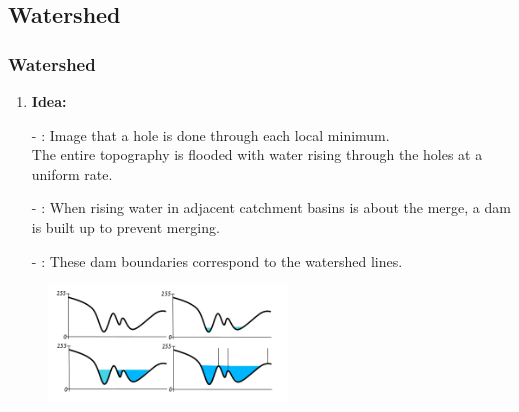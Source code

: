 \documentclass[notheorems,mathserif,table,compress]{beamer}  %
\begin{document}
\subsection{Watershed}
\begin{frame}
    \frametitle{Watershed}
    \begin{enumerate}[{\color{black}{\Large (A)}}]
    \item  \textbf{\Large Idea:}
    \end{enumerate}
    \begin{itemize}
        \item[-] {\color{blue}{Hole}}: Image that a hole is done through each local minimum.\\ 
	\hspace{0.4in}The entire topography is flooded with water rising through the holes at a uniform rate.
        \item[-] {\color{blue}{Dam}}: When rising water in adjacent catchment basins is about the merge, a dam is built up to prevent merging.
        \item[-] {\color{blue}{Lines}}: These dam boundaries correspond to the watershed lines.
    \end{itemize}
  \begin{figure}[!ht]
  \centering\includegraphics[width=2.5in]{region3.png}
  \end{figure} 
\end{frame}



\end{document}
